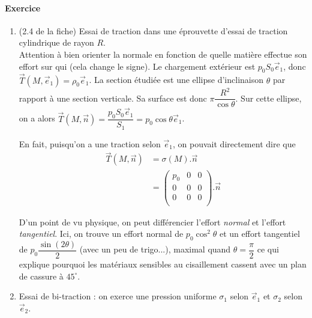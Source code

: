 \documentclass{article}
\begin{document}
\paragraph{Exercice}
\begin{enumerate}
\item (2.4 de la fiche) 
Essai de traction dans une éprouvette d'essai de traction cylindrique de rayon $R$.\\
Attention à bien orienter la normale en fonction de quelle matière effectue son effort sur qui (cela change le signe). Le chargement extérieur est $p_0 S_0 \vec{e}_1$, donc $\vec{T}(M,\vec{e}_1)=\rho_0 \vec{e}_1$. La section étudiée est une ellipse d'inclinaison $\theta$ par rapport à  une section verticale. Sa surface est donc $\pi \dfrac{R^2}{\cos \theta}$. Sur cette ellipse, on a alors $\vec{T}(M,\vec{n})=\dfrac{p_0 S_0 \vec{e}_1}{S_1}=p_0\cos \theta \vec{e}_1$.

En fait, puisqu'on a une traction selon $\vec{e}_1$, on pouvait directement dire que
\begin{align*}
\vec{T}(M,\vec{n}) & = \sigma (M).\vec{n}\\
& = \begin{pmatrix}
p_0 & 0 & 0 \\
0 & 0 & 0\\
0 & 0 & 0\\
\end{pmatrix} . \vec{n}
\end{align*}

D'un point de vu physique, on peut différencier l'effort \emph{normal} et l'effort \emph{tangentiel}. Ici, on trouve un effort normal de $p_0\cos^2 \theta$ et un effort tangentiel de $p_0 \dfrac{\sin (2\theta)}{2}$ (avec un peu de trigo...), maximal quand $\theta = \dfrac{\pi}{2}$ ce qui explique pourquoi les matériaux sensibles au cisaillement cassent avec un plan de cassure à $45^\circ$.

\item Essai de bi-traction : on exerce une pression uniforme $\sigma_1$ selon $\vec{e}_1$ et $\sigma_2$ selon $\vec{e}_2$.


\end{enumerate}
\end{document}
